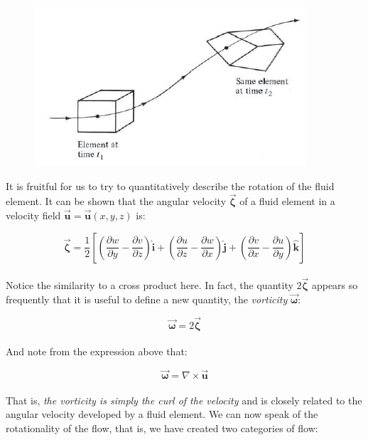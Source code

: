 \documentclass[11pt]{article}
\begin{document}
\begin{figure}[h]
    \includegraphics{elementrottrans.png}
    \centering
\end{figure}
\noindent
It is fruitful for us to try to quantitatively describe the rotation of the fluid element. It can be shown that the angular velocity $\vec{\bm{\zeta}}$ of a fluid element in a velocity field $\vec{\bm{u}} = \vec{\bm{u}}(x, y, z)$ is:

\begin{equation*}
    \vec{\bm{\zeta}} = \frac{1}{2}\left[\left(\frac{\partial w}{\partial y} - \frac{\partial v}{\partial z}\right)\hat{\bm{i}} + \left(\frac{\partial u}{\partial z} - \frac{\partial w}{\partial x}\right)\hat{\bm{j}}+\left(\frac{\partial v}{\partial x} - \frac{\partial u}{\partial y}\right)\hat{\bm{k}}\right]
\end{equation*}\\
\noindent
Notice the similarity to a cross product here. In fact, the quantity $2\vec{\bm{\zeta}}$ appears so frequently that it is useful to define a new quantity, the \emph{vorticity} $\vec{\bm{\omega}}$:

\begin{equation*}
    \vec{\bm{\omega}} = 2\vec{\bm{\zeta}}
\end{equation*} \\ 
\noindent
And note from the expression above that:

\begin{equation*}
    \vec{\bm{\omega}} = \nabla \times \vec{\bm{u}}
\end{equation*}\\
\noindent
That is, \emph{the vorticity is simply the curl of the velocity} and is closely related to the angular velocity developed by a fluid element. We can now speak of the rotationality of the flow, that is, we have created two categories of flow:
\end{document}
